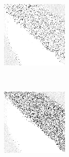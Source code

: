 \begin{figure}
\begin{subfigure}[t]{0.22\textwidth}
		\caption{\handmaxavg}
	\end{subfigure}
~
	\begin{subfigure}[t]{0.22\textwidth}
		\includegraphics[width=\textwidth]{images/findings/round1/strategies_handmaxmed_pone.png}
		\caption{\handmaxmed}
	\end{subfigure}
	~
	\begin{subfigure}[t]{0.22\textwidth}
		\includegraphics[width=\textwidth]{images/findings/round1/strategies_handmaxposs_pone.png}
		\caption{\handmaxposs}
	\end{subfigure}


\end{figure}
